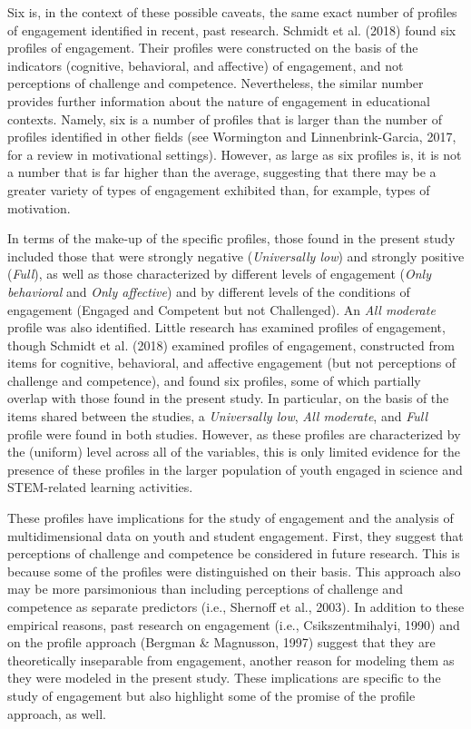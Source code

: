 \documentclass[]{msu-thesis}
\theoremstyle{definition}
\theoremstyle{definition}
\theoremstyle{definition}
\theoremstyle{remark}
\begin{document}
Six is, in the context of these possible caveats, the same exact number
of profiles of engagement identified in recent, past research. Schmidt
et al. (2018) found six profiles of engagement. Their profiles were
constructed on the basis of the indicators (cognitive, behavioral, and
affective) of engagement, and not perceptions of challenge and
competence. Nevertheless, the similar number provides further
information about the nature of engagement in educational contexts.
Namely, six is a number of profiles that is larger than the number of
profiles identified in other fields (see Wormington and
Linnenbrink-Garcia, 2017, for a review in motivational settings).
However, as large as six profiles is, it is not a number that is far
higher than the average, suggesting that there may be a greater variety
of types of engagement exhibited than, for example, types of motivation.

In terms of the make-up of the specific profiles, those found in the
present study included those that were strongly negative
(\emph{Universally low}) and strongly positive (\emph{Full}), as well as
those characterized by different levels of engagement (\emph{Only
behavioral} and \emph{Only affective}) and by different levels of the
conditions of engagement (Engaged and Competent but not Challenged). An
\emph{All moderate} profile was also identified. Little research has
examined profiles of engagement, though Schmidt et al. (2018) examined
profiles of engagement, constructed from items for cognitive,
behavioral, and affective engagement (but not perceptions of challenge
and competence), and found six profiles, some of which partially overlap
with those found in the present study. In particular, on the basis of
the items shared between the studies, a \emph{Universally low},
\emph{All moderate}, and \emph{Full} profile were found in both studies.
However, as these profiles are characterized by the (uniform) level
across all of the variables, this is only limited evidence for the
presence of these profiles in the larger population of youth engaged in
science and STEM-related learning activities.

These profiles have implications for the study of engagement and the
analysis of multidimensional data on youth and student engagement.
First, they suggest that perceptions of challenge and competence be
considered in future research. This is because some of the profiles were
distinguished on their basis. This approach also may be more
parsimonious than including perceptions of challenge and competence as
separate predictors (i.e., Shernoff et al., 2003). In addition to these
empirical reasons, past research on engagement (i.e., Csikszentmihalyi,
1990) and on the profile approach (Bergman \& Magnusson, 1997) suggest
that they are theoretically inseparable from engagement, another reason
for modeling them as they were modeled in the present study. These
implications are specific to the study of engagement but also highlight
some of the promise of the profile approach, as well.
\end{document}
